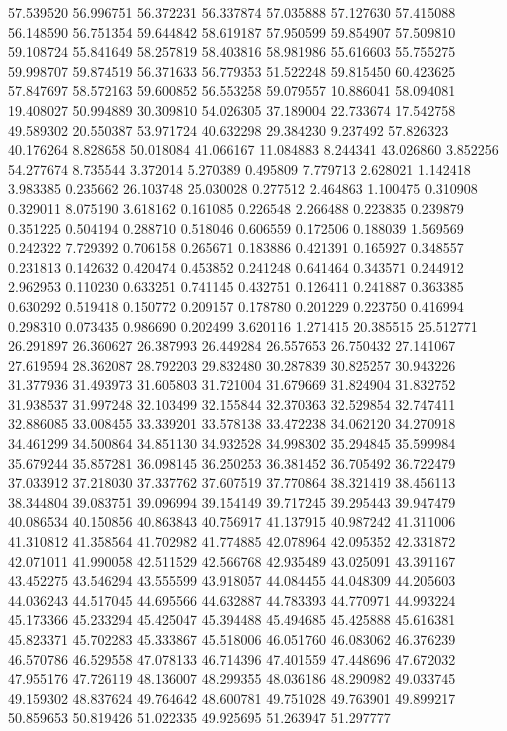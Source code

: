 57.539520
56.996751
56.372231
56.337874
57.035888
57.127630
57.415088
56.148590
56.751354
59.644842
58.619187
57.950599
59.854907
57.509810
59.108724
55.841649
58.257819
58.403816
58.981986
55.616603
55.755275
59.998707
59.874519
56.371633
56.779353
51.522248
59.815450
60.423625
57.847697
58.572163
59.600852
56.553258
59.079557
10.886041
58.094081
19.408027
50.994889
30.309810
54.026305
37.189004
22.733674
17.542758
49.589302
20.550387
53.971724
40.632298
29.384230
9.237492
57.826323
40.176264
8.828658
50.018084
41.066167
11.084883
8.244341
43.026860
3.852256
54.277674
8.735544
3.372014
5.270389
0.495809
7.779713
2.628021
1.142418
3.983385
0.235662
26.103748
25.030028
0.277512
2.464863
1.100475
0.310908
0.329011
8.075190
3.618162
0.161085
0.226548
2.266488
0.223835
0.239879
0.351225
0.504194
0.288710
0.518046
0.606559
0.172506
0.188039
1.569569
0.242322
7.729392
0.706158
0.265671
0.183886
0.421391
0.165927
0.348557
0.231813
0.142632
0.420474
0.453852
0.241248
0.641464
0.343571
0.244912
2.962953
0.110230
0.633251
0.741145
0.432751
0.126411
0.241887
0.363385
0.630292
0.519418
0.150772
0.209157
0.178780
0.201229
0.223750
0.416994
0.298310
0.073435
0.986690
0.202499
3.620116
1.271415
20.385515
25.512771
26.291897
26.360627
26.387993
26.449284
26.557653
26.750432
27.141067
27.619594
28.362087
28.792203
29.832480
30.287839
30.825257
30.943226
31.377936
31.493973
31.605803
31.721004
31.679669
31.824904
31.832752
31.938537
31.997248
32.103499
32.155844
32.370363
32.529854
32.747411
32.886085
33.008455
33.339201
33.578138
33.472238
34.062120
34.270918
34.461299
34.500864
34.851130
34.932528
34.998302
35.294845
35.599984
35.679244
35.857281
36.098145
36.250253
36.381452
36.705492
36.722479
37.033912
37.218030
37.337762
37.607519
37.770864
38.321419
38.456113
38.344804
39.083751
39.096994
39.154149
39.717245
39.295443
39.947479
40.086534
40.150856
40.863843
40.756917
41.137915
40.987242
41.311006
41.310812
41.358564
41.702982
41.774885
42.078964
42.095352
42.331872
42.071011
41.990058
42.511529
42.566768
42.935489
43.025091
43.391167
43.452275
43.546294
43.555599
43.918057
44.084455
44.048309
44.205603
44.036243
44.517045
44.695566
44.632887
44.783393
44.770971
44.993224
45.173366
45.233294
45.425047
45.394488
45.494685
45.425888
45.616381
45.823371
45.702283
45.333867
45.518006
46.051760
46.083062
46.376239
46.570786
46.529558
47.078133
46.714396
47.401559
47.448696
47.672032
47.955176
47.726119
48.136007
48.299355
48.036186
48.290982
49.033745
49.159302
48.837624
49.764642
48.600781
49.751028
49.763901
49.899217
50.859653
50.819426
51.022335
49.925695
51.263947
51.297777
